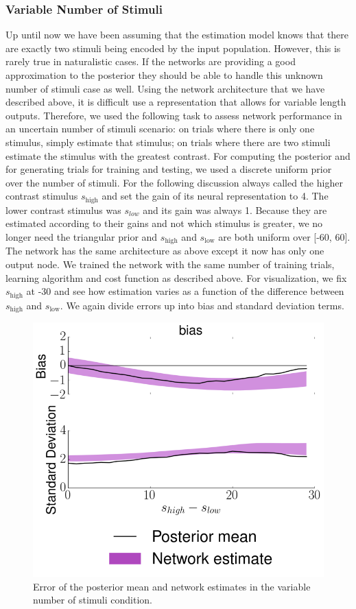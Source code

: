 \documentclass{article} %
\begin{document}
\subsubsection{Variable Number of Stimuli}
Up until now we have been assuming that the estimation model knows that there are exactly two stimuli being encoded by the input population. However, this is rarely true in naturalistic cases. If the networks are providing a good approximation to the posterior they should be able to handle this unknown number of stimuli case as well. Using the network architecture that we have described above, it is difficult use a representation that allows for variable length outputs. Therefore, we used the following task to assess network performance in an uncertain number of stimuli scenario: on trials where there is only one stimulus, simply estimate that stimulus; on trials where there are two stimuli estimate the stimulus with the greatest contrast. For computing the posterior and for generating trials for training and testing, we used a discrete uniform prior over the number of stimuli. For the following discussion always called the higher contrast stimulus $s_{\text{high}}$ and set the gain of its neural representation to 4. The lower contrast stimulus was $s_{low}$ and its gain was always 1. Because they are estimated according to their gains and not which stimulus is greater, we no longer need the triangular prior and $s_{\text{high}}$ and $s_{\text{low}}$ are both uniform over [-60, 60]. The network has the same architecture as above except it now has only one output node. We trained the network with the same number of training trials, learning algorithm and cost function as described above. For visualization, we fix $s_{\text{high}}$ at -30 and see how estimation varies as a function of the difference between $s_{\text{high}}$ and $s_{\text{low}}$. We again divide errors up into bias and standard deviation terms.
\begin{figure}[h]
\centering
\includegraphics[width = .5\textwidth]{Single_Estimation.png}
\caption{Error of the posterior mean and network estimates in the variable number of stimuli condition.}
\end{figure}
\end{document}
